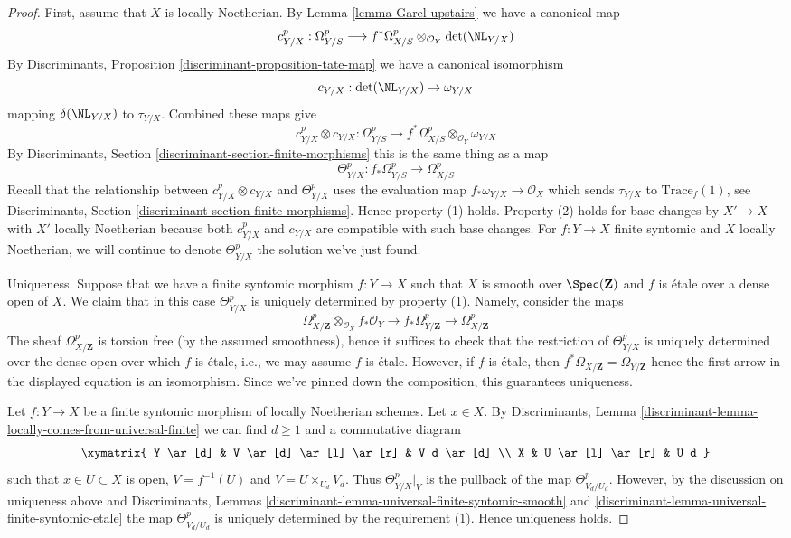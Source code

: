 \begin{proof}
First, assume that $X$ is locally Noetherian. By
Lemma \ref{lemma-Garel-upstairs} we have a canonical map
$$
c^p_{Y/X} : \Omega_{Y/S}^p
\longrightarrow
f^*\Omega_{X/S}^p \otimes_{\mathcal{O}_Y} \det(\NL_{Y/X})
$$
By Discriminants, Proposition \ref{discriminant-proposition-tate-map}
we have a canonical isomorphism
$$
c_{Y/X} : \det(\NL_{Y/X}) \to \omega_{Y/X}
$$
mapping $\delta(\NL_{Y/X})$ to $\tau_{Y/X}$. Combined these maps give
$$
c^p_{Y/X} \otimes c_{Y/X} :
\Omega_{Y/S}^p
\longrightarrow
f^*\Omega_{X/S}^p \otimes_{\mathcal{O}_Y} \omega_{Y/X}
$$
By Discriminants, Section \ref{discriminant-section-finite-morphisms}
this is the same thing as a map
$$
\Theta_{Y/X}^p :
f_*\Omega_{Y/S}^p
\longrightarrow
\Omega_{X/S}^p
$$
Recall that the relationship between $c^p_{Y/X} \otimes c_{Y/X}$
and $\Theta_{Y/X}^p$ uses the evaluation map
$f_*\omega_{Y/X} \to \mathcal{O}_X$
which sends $\tau_{Y/X}$ to $\text{Trace}_f(1)$, see
Discriminants, Section \ref{discriminant-section-finite-morphisms}.
Hence property (1) holds. Property (2) holds for base changes by
$X' \to X$ with $X'$ locally Noetherian because both $c^p_{Y/X}$ and
$c_{Y/X}$ are compatible with such base changes. For $f : Y \to X$
finite syntomic and $X$ locally Noetherian,
we will continue to denote $\Theta^p_{Y/X}$ the solution we've just found.

\medskip\noindent
Uniqueness. Suppose that we have a finite syntomic morphism
$f: Y \to X$ such that $X$ is smooth over $\Spec(\mathbf{Z})$
and $f$ is \'etale over a dense open of $X$. We claim that
in this case $\Theta^p_{Y/X}$ is uniquely determined by property (1).
Namely, consider the maps
$$
\Omega^p_{X/\mathbf{Z}} \otimes_{\mathcal{O}_X} f_*\mathcal{O}_Y \to
f_*\Omega^p_{Y/\mathbf{Z}} \to
\Omega^p_{X/\mathbf{Z}}
$$
The sheaf $\Omega^p_{X/\mathbf{Z}}$ is torsion free (by the assumed
smoothness), hence it suffices to check that the restriction of
$\Theta^p_{Y/X}$ is uniquely determined over the dense open over
which $f$ is \'etale, i.e., we may assume $f$ is \'etale.
However, if $f$ is \'etale, then
$f^*\Omega_{X/\mathbf{Z}} = \Omega_{Y/\mathbf{Z}}$
hence the first arrow in the displayed equation is an isomorphism.
Since we've pinned down the composition, this guarantees uniqueness.

\medskip\noindent
Let $f : Y \to X$ be a finite syntomic morphism of locally Noetherian schemes.
Let $x \in X$. By Discriminants, Lemma
\ref{discriminant-lemma-locally-comes-from-universal-finite}
we can find $d \geq 1$ and a commutative diagram
$$
\xymatrix{
Y \ar[d] &
V \ar[d] \ar[l] \ar[r] &
V_d \ar[d] \\
X &
U \ar[l] \ar[r] &
U_d
}
$$
such that $x \in U \subset X$ is open, $V = f^{-1}(U)$
and $V = U \times_{U_d} V_d$. Thus $\Theta^p_{Y/X}|_V$
is the pullback of the map $\Theta^p_{V_d/U_d}$.
However, by the discussion on uniqueness above and
Discriminants, Lemmas
\ref{discriminant-lemma-universal-finite-syntomic-smooth} and
\ref{discriminant-lemma-universal-finite-syntomic-etale}
the map $\Theta^p_{V_d/U_d}$ is uniquely determined
by the requirement (1). Hence uniqueness holds.


\end{proof}

